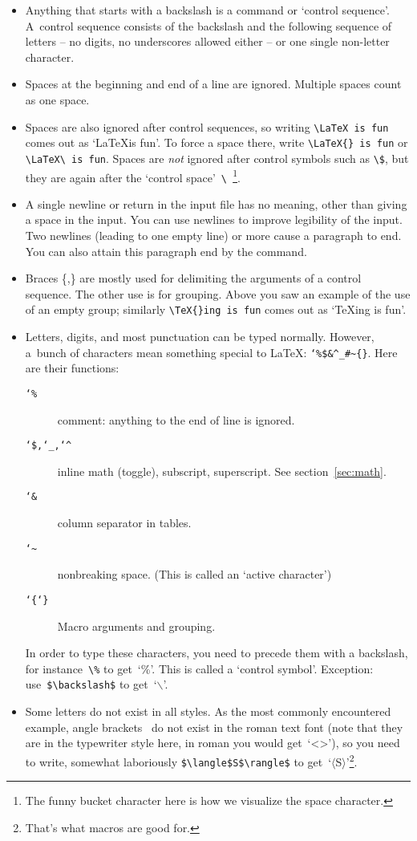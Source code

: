 \begin{itemize}
\item Anything that starts with a backslash is a command or `control
  sequence'. A~control sequence consists of the backslash and the
  following sequence of letters -- no digits, no underscores allowed
  either -- or one single non-letter character.
\item Spaces at the beginning and end of a line are
  ignored. Multiple spaces count as one space.
\item Spaces are also ignored after control sequences, so writing
  \verb+\LaTeX is fun+ comes out as `\LaTeX is fun'. To force a space
  there, write \verb+\LaTeX{} is fun+ or \verb+\LaTeX\ is fun+. Spaces
  are {\em not} ignored after control symbols such as \verb+\$+, but
  they are again after the `control
  space'~\verb*+\ +\footnote{The funny bucket character here is how we
  visualize the space character.}.
\item A single newline or return in the input file has no meaning,
  other than giving a space in the input. You can use newlines to improve
  legibility of the input. Two newlines (leading to one empty line) or
  more cause a paragraph to end. You can also attain this paragraph
  end by the  command.
\item Braces \{,\} are mostly used for delimiting the arguments of a
  control sequence. The other use is for grouping. Above you saw an
  example of the use of an empty group; similarly
  \verb+\TeX{}ing is fun+ comes out as `\TeX{}ing is fun'.
\item Letters, digits, and most punctuation can be typed
  normally. However, a~bunch of characters mean something special to
  \LaTeX: {\tt\char`\%}\verb-$&^_#~{}-.
  Here are their functions:
\begin{description}
\item[\tt\char`\%] comment: anything to the end of line is ignored.
\item[\tt\char`\$,\char`\_,\char`\^] inline math (toggle), subscript,
  superscript. See section~\ref{sec:math}.
\item[\tt\char`\&] column separator in tables.
\item[\tt\char`\~] nonbreaking space. (This is called an
  `active character')
\item[\tt\char`\{\char`\}] Macro arguments and grouping.
\end{description}
  In order to type these characters, you need to precede
  them with a backslash, for instance~\verb+\%+ to
  get~`\%'.
  This is called a
  `control symbol'. Exception:
  use~\verb+$\backslash$+ to get~`$\backslash$'.
\item Some letters do not exist in all styles. As the most commonly
  encountered example, angle brackets~\n{<>} do not exist in the roman
  text font (note that they are in the typewriter style here, in roman
  you would get~`<>'), so you
  need to write, somewhat laboriously \verb+$\langle$S$\rangle$+ to
  get~`$\langle$S$\rangle$'\footnote{That's what macros are good for.}.
\end{itemize}

